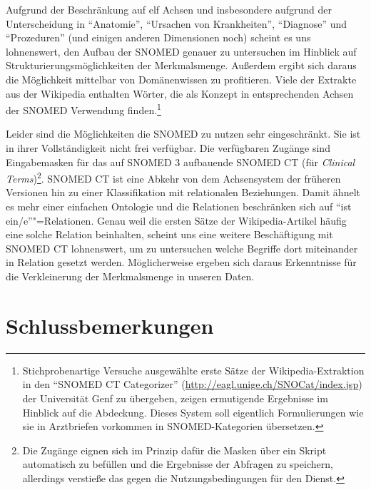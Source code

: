 \documentclass[pagesize,paper=A4,DIV=calc,fontsize=12pt,draft=false]{scrreprt}
\begin{document}
Aufgrund der Beschränkung auf elf Achsen und insbesondere aufgrund der Unterscheidung in \enquote{Anatomie}, \enquote{Ursachen von Krankheiten}, \enquote{Diagnose} und \enquote{Prozeduren} (und einigen anderen Dimensionen noch) scheint es uns lohnenswert, den Aufbau der SNOMED genauer zu untersuchen im Hinblick auf Strukturierungsmöglichkeiten der Merkmalsmenge.
Außerdem ergibt sich daraus die Möglichkeit mittelbar von Domänenwissen zu profitieren.
Viele der Extrakte aus der Wikipedia enthalten Wörter, die als Konzept in entsprechenden Achsen der SNOMED Verwendung finden.\footnote{Stichprobenartige Versuche ausgewählte erste Sätze der Wikipedia-Extraktion in den \enquote{SNOMED CT Categorizer} (\href{http://eagl.unige.ch/SNOCat/index.jsp}{http://eagl.unige.ch/SNOCat/index.jsp}) der Universität Genf zu übergeben, zeigen ermutigende Ergebnisse im Hinblick auf die Abdeckung. Dieses System soll eigentlich Formulierungen wie sie in Arztbriefen vorkommen in SNOMED-Kategorien übersetzen.}

Leider sind die Möglichkeiten die SNOMED zu nutzen sehr eingeschränkt. 
Sie ist in ihrer Vollständigkeit nicht frei verfügbar.
Die verfügbaren Zugänge sind Eingabemasken für das auf SNOMED 3 aufbauende SNOMED CT (für \emph{Clinical Terms})\footnote{Die Zugänge eignen sich im Prinzip dafür die Masken über ein Skript automatisch zu befüllen und die Ergebnisse der Abfragen zu speichern, allerdings verstieße das gegen die Nutzungsbedingungen für den Dienst.}. 
SNOMED CT ist eine Abkehr von dem Achsensystem der früheren Versionen hin zu einer Klassifikation mit relationalen Beziehungen.
Damit ähnelt es mehr einer einfachen Ontologie und die Relationen beschränken sich auf \enquote{ist ein/e}"=Relationen.
Genau weil die ersten Sätze der Wikipedia-Artikel häufig eine solche Relation beinhalten, scheint uns eine weitere Beschäftigung mit SNOMED CT lohnenswert, um zu untersuchen welche Begriffe dort miteinander in Relation gesetzt werden.
Möglicherweise ergeben sich daraus Erkenntnisse für die Verkleinerung der Merkmalsmenge in unseren Daten.

\section{Schlussbemerkungen}
\end{document}
